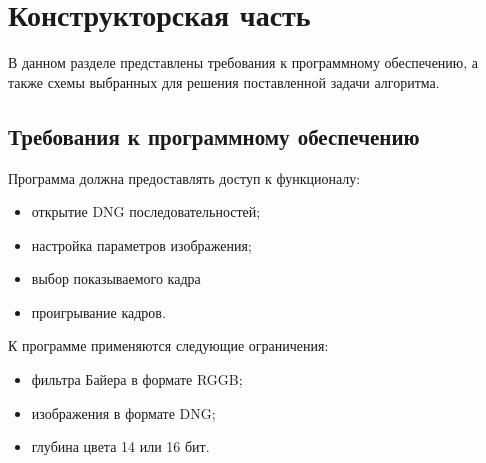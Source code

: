 \chapter{Конструкторская часть}

В данном разделе представлены требования к программному обеспечению, а также схемы выбранных для решения поставленной задачи алгоритма.

\section{Требования к программному обеспечению}

Программа должна предоставлять доступ к функционалу:
\begin{itemize}
	\item открытие DNG последовательностей;
	\item настройка параметров изображения;
	\item выбор показываемого кадра
	\item проигрывание кадров.
\end{itemize}

К программе применяются следующие ограничения:
\begin{itemize}
	\item фильтра Байера в формате RGGB;
	\item изображения в формате DNG;
	\item глубина цвета 14 или 16 бит.	
\end{itemize}

